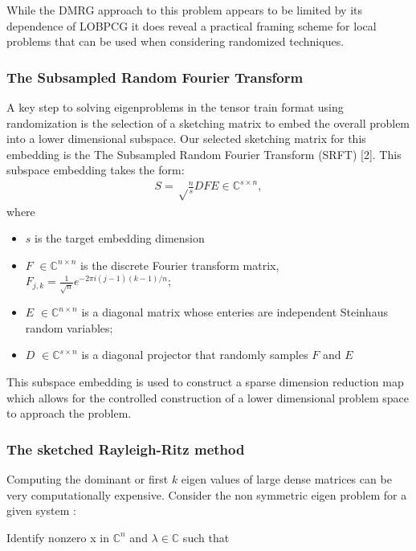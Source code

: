 \documentclass[%
 aip,12pt
 amsmath,amssymb,
 reprint,%
]{revtex4-1}
\begin{document}
\begin{center}

\end{center}
While the DMRG approach to this problem appears to be limited by its dependence of LOBPCG it does reveal a practical framing scheme for local problems that can be used when considering randomized techniques.

\subsubsection{\label{sec:level3}The Subsampled Random Fourier Transform }
A key step to solving eigenproblems in the tensor train format using randomization is the selection of a sketching matrix to embed the overall problem into a lower dimensional subspace. Our selected sketching matrix for this embedding is the The Subsampled Random Fourier Transform (SRFT) [2]. This subspace embedding takes the form:
\begin{eqnarray}
  S=\sqrt\frac{n}{s} DFE \in \mathbb{C}^{s\times n},
  \label{eq:two}
\end{eqnarray}
where
\begin{itemize}
  \item $s$ is the target embedding dimension
  \item $F$ $\in \mathbb{C}^{n \times n}$ is the discrete Fourier transform matrix, $F_{j,k}=\frac{1}{\sqrt{n}}e^{-2\pi i(j-1)(k-1)/n}$;
  \item $E$ $\in \mathbb{C}^{n \times n}$ is a diagonal matrix whose enteries are independent Steinhaus random variables;
  \item $D$ $\in \mathbb{C}^{s \times n}$ is a diagonal projector that randomly samples $F$ and $E$

\end{itemize}
This subspace embedding is used to construct a sparse dimension reduction map which allows for the controlled construction of a lower dimensional problem space to approach the problem.
\subsubsection{\label{sec:level3}The sketched Rayleigh-Ritz method }
Computing the dominant or first $k$ eigen values of large dense matrices can be very computationally expensive.
Consider the non symmetric eigen problem for a given system :

Identify nonzero x in $\mathbb{C}^n$ and $\lambda \in \mathbb{C}$ such that\\
\end{document}
